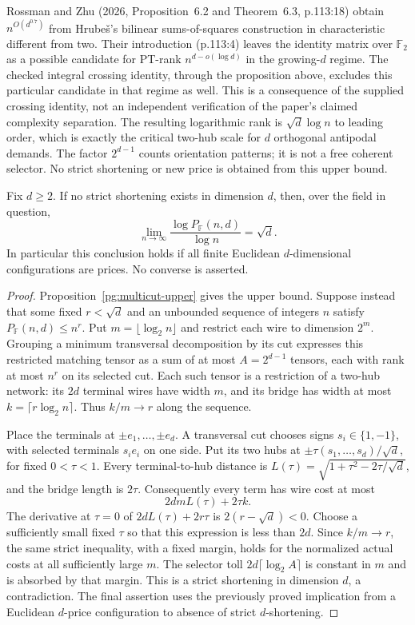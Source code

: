 Rossman and Zhu (2026, Proposition~6.2 and Theorem~6.3, p.113:18)
obtain $n^{O(d^{0.7})}$ from Hrube\v{s}'s bilinear sums-of-squares
construction in characteristic different from two. Their introduction
(p.113:4) leaves the identity matrix over $\mathbb F_2$ as a possible
candidate for PT-rank $n^{d-o(\log d)}$ in the growing-$d$ regime.
The checked integral crossing identity, through the proposition above,
excludes this particular candidate in that regime as well. This is a
consequence of the supplied crossing identity, not an independent
verification of the paper's claimed complexity separation.
The resulting logarithmic rank is $\sqrt d\log n$ to leading order,
which is exactly the critical two-hub scale for $d$ orthogonal
antipodal demands. The factor $2^{d-1}$ counts orientation patterns;
it is not a free coherent selector. No strict shortening or new price
is obtained from this upper bound.


\begin{corollary}
\label{pg:multicut-flat}
Fix $d\geq2$. If no strict shortening exists in dimension $d$, then,
over the field in question,
\[
 \lim_{n\to\infty}\frac{\log P_{\mathbb F}(n,d)}{\log n}=\sqrt d.
 \tag{PG-MULTICUT-flat}
\]
In particular this conclusion holds if all finite Euclidean
$d$-dimensional configurations are prices. No converse is asserted.
\end{corollary}
\begin{proof}
Proposition~\ref{pg:multicut-upper} gives the upper bound. Suppose instead
that some fixed $r<\sqrt d$ and an unbounded sequence of integers $n$
satisfy $P_{\mathbb F}(n,d)\leq n^r$.
Put $m=\lfloor\log_2n\rfloor$ and restrict each wire to dimension $2^m$.
Grouping a minimum transversal decomposition by its cut expresses this
restricted matching tensor as a sum of at most $A=2^{d-1}$ tensors, each
with rank at most $n^r$ on its selected cut. Each such tensor is a
restriction of a two-hub network: its $2d$ terminal wires have width $m$,
and its bridge has width at most
$k=\lceil r\log_2n\rceil$. Thus $k/m\to r$ along the sequence.

Place the terminals at $\pm e_1,\ldots,\pm e_d$.
A transversal cut chooses signs $s_i\in\{1,-1\}$, with selected terminals
$s_ie_i$ on one side. Put its two hubs at
$\pm\tau(s_1,\ldots,s_d)/\sqrt d$, for fixed $0<\tau<1$.
Every terminal-to-hub distance is
$L(\tau)=\sqrt{1+\tau^2-2\tau/\sqrt d}$, and the bridge length is $2\tau$.
Consequently every term has wire cost at most
\[
 2dmL(\tau)+2\tau k.
\]
The derivative at $\tau=0$ of $2dL(\tau)+2r\tau$ is
$2(r-\sqrt d)<0$. Choose a sufficiently small fixed $\tau$ so that this
expression is less than $2d$. Since $k/m\to r$, the same strict
inequality, with a fixed margin, holds for the normalized actual costs
at all sufficiently large $m$. The selector toll
$2d\lceil\log_2A\rceil$ is constant in $m$ and is absorbed by that margin.
This is a strict shortening in dimension $d$, a contradiction.
The final assertion uses the previously proved implication from a
Euclidean $d$-price configuration to absence of strict $d$-shortening.
\end{proof}
